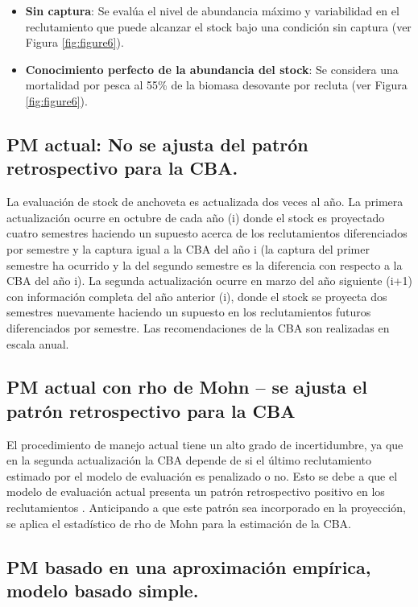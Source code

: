 \begin{itemize}
    \item \textbf{Sin captura}: Se evalúa el nivel de abundancia máximo y variabilidad en el reclutamiento que puede alcanzar el stock bajo una condición sin captura (ver Figura \ref{fig:figure6}). 
    \item \textbf{Conocimiento perfecto de la abundancia del stock}: Se considera una mortalidad por pesca al 55\% de la biomasa desovante por recluta (ver Figura \ref{fig:figure6}). 
\end{itemize}


\subsection{PM actual: No se ajusta del patrón retrospectivo para la CBA.}

La evaluación de stock de anchoveta es actualizada dos veces al año. La primera actualización ocurre en octubre de cada año (i) donde el stock es proyectado cuatro semestres haciendo un supuesto acerca de los reclutamientos diferenciados por semestre y la captura igual a la CBA del año i (la captura del primer semestre ha ocurrido y la del segundo semestre es la diferencia con respecto a la CBA del año i). La segunda actualización ocurre en marzo del año siguiente (i+1) con información completa del año anterior (i), donde el stock se proyecta dos semestres nuevamente haciendo un supuesto en los reclutamientos futuros diferenciados por semestre. Las recomendaciones de la CBA son realizadas en escala anual.

\subsection{PM actual con rho de Mohn – se ajusta el patrón retrospectivo para la CBA}

El procedimiento de manejo actual tiene un alto grado de incertidumbre, ya que en la segunda actualización la CBA depende de si el último reclutamiento estimado por el modelo de evaluación es penalizado o no. Esto se debe a que el modelo de evaluación actual presenta un patrón retrospectivo positivo en los reclutamientos \citep{espinola2023}. Anticipando a que este patrón sea incorporado en la proyección, se aplica el estadístico de rho de Mohn \citep{mohn1999retrospective,hurtado2015looking,huynh2022closed} para la estimación de la CBA.

\subsection{PM basado en una aproximación empírica, modelo basado simple.}

